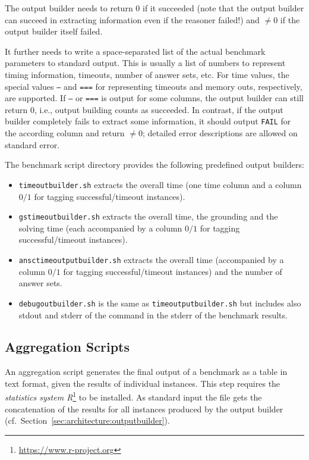 \documentclass[a4paper]{article}
\begin{document}
			The output builder needs to return $0$ if it succeeded (note that the output builder can succeed in extracting information even if the reasoner failed!)
			and $\not=0$ if the output builder itself failed.
			
			It further needs to write a space-separated list of the actual benchmark parameters to standard output.
			This is usually a list of numbers to represent timing information, timeouts, number of answer sets, etc. For time values,
			the special values {\tt ---} and {\tt ===} for representing timeouts and memory outs, respectively, are supported.
			If {\tt ---} or {\tt ===} is output for some columns, the output builder can still return $0$, i.e.,
			output building counts as succeeded.
			In contrast, if the output builder completely fails to extract some information, it should output {\tt FAIL} for the according column
			and return $\not=0$; detailed error descriptions are allowed on standard error.
			
			The benchmark script directory provides the following predefined output builders:
					
			\begin{itemize}
			    \item {\tt timeoutbuilder.sh} extracts the overall time (one time column and a column $0/1$ for tagging successful/timeout instances).
			    \item {\tt gstimeoutbuilder.sh} extracts the overall time, the grounding and the solving time (each accompanied by a column $0/1$ for tagging successful/timeout instances).
			    \item {\tt ansctimeoutputbuilder.sh} extracts the overall time (accompanied by a column $0/1$ for tagging successful/timeout instances) and the number of answer sets.
                            \item {\tt debugoutbuilder.sh} is the same as {\tt timeoutputbuilder.sh} but includes also stdout and stderr of the command in the stderr of the benchmark results.
			\end{itemize}
	
		\subsection{Aggregation Scripts}
		\label{sec:architecture:aggregate}

			An aggregation script
		    generates the final output of a benchmark as a table in text format,
		    given the results of individual instances.
			This step requires the \emph{statistics system R}\footnote{\url{https://www.r-project.org}} to be installed.
		    As standard input the file gets the concatenation of the results for all instances produced by the output builder (cf.~Section~\ref{sec:architecture:outputbuilder}).
	
\end{document}
